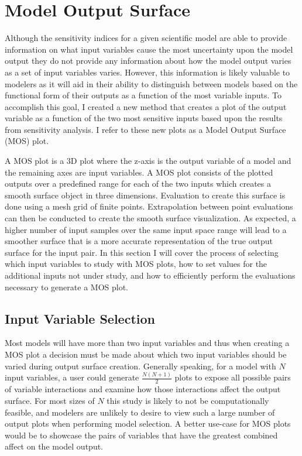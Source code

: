 \section{Model Output Surface\label{sec:out_surf}}
Although the sensitivity indices for a given scientific model are able to provide information on what input variables cause the most uncertainty upon the model output they do not provide any information about how the model output varies as a set of input variables varies.
However, this information is likely valuable to modelers as it will aid in their ability to distinguish between models based on the functional form of their outputs as a function of the most variable inputs.
To accomplish this goal, I created a new method that creates a plot of the output variable as a function of the two most sensitive inputs based upon the results from sensitivity analysis.
I refer to these new plots as a Model Output Surface (MOS) plot.

A MOS plot is a 3D plot where the z-axis is the output variable of a model and the remaining axes are input variables.
A MOS plot consists of the plotted outputs over a predefined range for each of the two inputs which creates a smooth surface object in three dimensions.
Evaluation to create this surface is done using a mesh grid of finite points.
Extrapolation between point evaluations can then be conducted to create the smooth surface visualization.
As expected, a higher number of input samples over the same input space range will lead to a smoother surface that is a more accurate representation of the true output surface for the input pair.
In this section I will cover the process of selecting which input variables to study with MOS plots, how to set values for the additional inputs not under study, and how to efficiently perform the evaluations necessary to generate a MOS plot.

\subsection{Input Variable Selection\label{sec:inp_var_sel}}
Most models will have more than two input variables and thus when creating a MOS plot a decision must be made about which two input variables should be varied during output surface creation. Generally speaking, for a model with $N$ input variables, a user could generate $\frac{N(N+1)}{2}$ plots to expose all possible pairs of variable interactions and examine how those interactions affect the output surface. For most sizes of $N$ this study is likely to not be computationally feasible, and modelers are unlikely to desire to view such a large number of output plots when performing model selection. A better use-case for MOS plots would be to showcase the pairs of variables that have the greatest combined affect on the model output.

